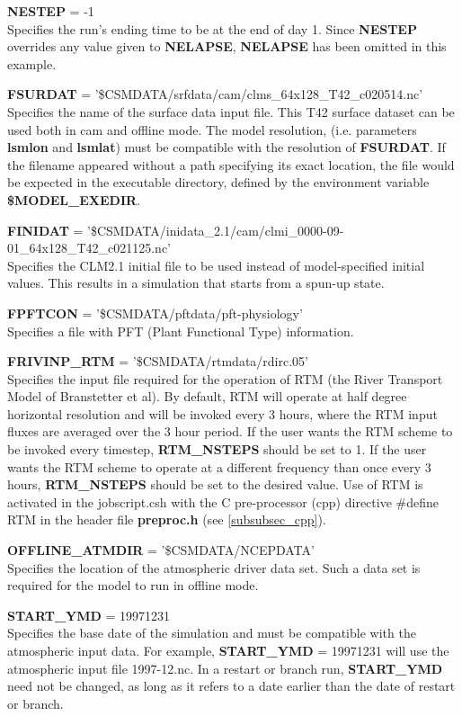 \medskip \noindent 
{\bf NESTEP} = -1 \\
Specifies the run's ending time to be at the end of day 1. Since {\bf
NESTEP} overrides any value given to {\bf NELAPSE}, {\bf NELAPSE}
has been omitted in this example.

\medskip \noindent 
{\bf FSURDAT} = '\$CSMDATA/srfdata/cam/clms\_64x128\_T42\_c020514.nc' \\ 
Specifies the name of the surface data input file. This T42 surface
dataset can be used both in cam and offline mode.  The model
resolution, (i.e. parameters {\bf lsmlon} and {\bf lsmlat}) must be
compatible with the resolution of {\bf FSURDAT}.  If the filename
appeared without a path specifying its exact location, the file would
be expected in the executable directory, defined by the environment
variable {\bf \$MODEL\_EXEDIR}.

\medskip \noindent 
{\bf FINIDAT} = '\$CSMDATA/inidata\_2.1/cam/clmi\_0000-09-01\_64x128\_T42\_c021125.nc' \\
Specifies the CLM2.1 initial file to be used instead of
model-specified initial values.  This results in a simulation that
starts from a spun-up state.

\medskip \noindent 
{\bf FPFTCON} = '\$CSMDATA/pftdata/pft-physiology' \\
Specifies a file with PFT (Plant Functional Type) information.  

\medskip \noindent 
{\bf FRIVINP\_RTM} = '\$CSMDATA/rtmdata/rdirc.05' \\
Specifies the input file required for the operation of RTM (the River
Transport Model of Branstetter et al). By default, RTM will operate at
half degree horizontal resolution and will be invoked every 3 hours,
where the RTM input fluxes are averaged over the 3 hour period.  If
the user wants the RTM scheme to be invoked every timestep, {\bf
RTM\_NSTEPS} should be set to 1. If the user wants the RTM scheme to
operate at a different frequency than once every 3 hours, {\bf
RTM\_NSTEPS} should be set to the desired value.  Use of RTM is
activated in the jobscript.csh with the C pre-processor (cpp) directive
\#define RTM in the header file {\bf preproc.h} (see \ref{subsubsec_cpp}).

\medskip \noindent 
{\bf OFFLINE\_ATMDIR} = '\$CSMDATA/NCEPDATA' \\
Specifies the location of the atmospheric driver data set. Such a data
set is required for the model to run in offline mode.

\medskip \noindent 
{\bf START\_YMD} = 19971231 \\ 
Specifies the base date of the simulation and must be compatible with
the atmospheric input data. For example, {\bf START\_YMD} = 19971231
will use the atmospheric input file 1997-12.nc. In a restart or branch
run, {\bf START\_YMD} need not be changed, as long as it refers to a
date earlier than the date of restart or branch.


